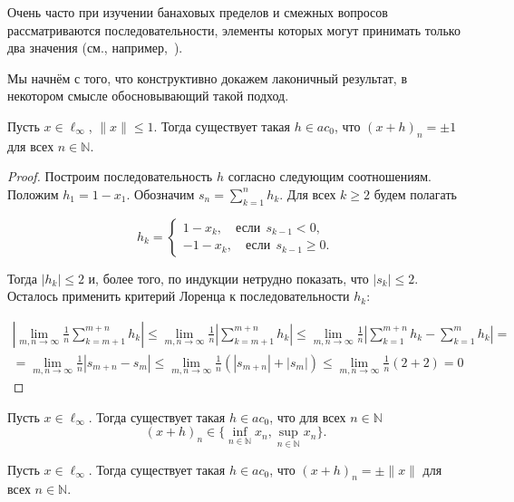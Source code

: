 Очень часто при изучении банаховых пределов и смежных вопросов
рассматриваются последовательности,
элементы которых могут принимать только два значения
(см., например,~\cite{connor1990almost,our-mz2019ac0,avdeev2021vestnik,avdeev2021vmzprimes}).


Мы начнём с того,
что конструктивно докажем лаконичный результат,
в некотором смысле обосновывающий такой подход.


\begin{lemma}
	Пусть $x\in\ell_\infty$, $\|x\|\leq 1$.
	Тогда существует такая $h\in ac_0$, что $(x+h)_n = \pm 1$ для всех $n\in\mathbb N$.
\end{lemma}

\begin{proof}
	Построим последовательность $h$ согласно следующим соотношениям.
	Положим $h_1 = 1-x_1$.
	Обозначим $s_n = \sum_{k=1}^n h_k$.
	Для всех $k\geq 2$ будем полагать

	$$
		h_k = \begin{cases}
			1-x_k, \quad\mbox{если}~~ s_{k-1} < 0,
			\\
			-1 - x_k,\quad\mbox{если}~~ s_{k-1} \geq 0
			.
		\end{cases}
	$$

	Тогда $|h_k| \leq 2$ и, более того, по индукции нетрудно показать, что $|s_k| \leq 2$. Осталось применить критерий Лоренца к последовательности $h_k$:

	\begin{multline*}
		\left|\lim_{m,n\to \infty} \frac{1}{n} \sum_{k=m+1}^{m+n} h_k\right| \leq
		\lim_{m,n\to \infty} \frac{1}{n} \left|\sum_{k=m+1}^{m+n} h_k\right| \leq
		\lim_{m,n\to \infty} \frac{1}{n} \left|\sum_{k=1}^{m+n} h_k - \sum_{k=1}^{m} h_k  \right| =
		\\=
		\lim_{m,n\to \infty} \frac{1}{n} \left|s_{m+n} - s_{m}  \right| \leq
		\lim_{m,n\to \infty} \frac{1}{n} (|s_{m+n}| + |s_{m} |) \leq
		\lim_{m,n\to \infty} \frac{1}{n} (2 + 2) =0
	\end{multline*}
\end{proof}

\begin{corollary}
	Пусть $x\in\ell_\infty$.
	Тогда существует такая $h\in ac_0$, что для всех $n\in\mathbb N$
	\begin{equation*}
		(x+h)_n \in \{\inf_{n\in\mathbb N} x_n,\sup_{n\in\mathbb N} x_n\}
		.
	\end{equation*}
\end{corollary}


\begin{corollary}
	Пусть $x\in\ell_\infty$.
	Тогда существует такая $h\in ac_0$, что $(x+h)_n =\pm \|x\|$ для всех $n\in\mathbb N$.
\end{corollary}

